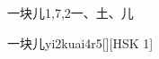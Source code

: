 \begin{entry}{一块儿}{1,7,2}{⼀、⼟、⼉}
  \begin{phonetics}{一块儿}{yi2kuai4r5}[][HSK 1]
  \end{phonetics}
\end{entry}
